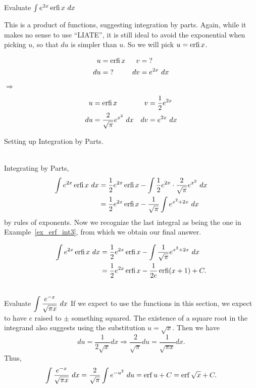 {Evaluate $\int e^{2x} \erfi x \ dx$}
{This is a product of functions, suggesting integration by parts.  Again, while it makes no sense to use ``LIATE'', it is still ideal to avoid the exponential when picking $u$, so that $du$ is simpler than $u$.  So we will pick $u=\operatorname{erfi} x$.

\noindent\begin{minipage}{\textwidth}
\noindent\begin{minipage}[t]{.45\textwidth}
\vskip-10pt
\begin{align*}
u&= \operatorname{erfi} x & v&=\text{?}\\
du&= \text{?} & dv&=e^{2x}\ dx
\end{align*}
\end{minipage}\begin{minipage}[t]{.1\textwidth}\centering\vskip15pt$\Rightarrow$\end{minipage}
\begin{minipage}[t]{.45\textwidth}
\vskip-10pt
\begin{align*}
u&= \operatorname{erfi} x & v&= \frac{1}{2} e^{2x}\\
du&=\frac{2}{\sqrt{\pi}} e^{x^2}\ dx  & dv&=e^{2x}\ dx
\end{align*}
\end{minipage}
\captionsetup{type=figure}%
\caption{Setting up Integration by Parts.}\label{fig:erf_int4}
\end{minipage}\\

Integrating by Parts,
\begin{align*}  \int e^{2x} \operatorname{erfi} x \ dx &= \frac{1}{2} e^{2x} \operatorname{erfi} x - \int\frac{1}{2} e^{2x} \cdot \frac{2}{\sqrt{\pi}} e^{x^2}  \ dx
\\&=  \frac{1}{2} e^{2x} \operatorname{erfi} x - \frac{1}{\sqrt{\pi}} \int  e^{x^2+2x}\ dx\end{align*}
by rules of exponents.  Now we recognize the last integral as being the one in Example~\ref{ex_erf_int3}, from which we obtain our final answer.

\begin{align*}
\int e^{2x} \operatorname{erfi} x \ dx &= \frac{1}{2} e^{2x} \operatorname{erfi} x - \int \frac{1}{\sqrt{\pi}} e^{x^2+2x}\ dx\\
&= \frac{1}{2} e^{2x} \operatorname{erfi} x - \frac{1}{2e} \operatorname{erfi}(x+1) +C.
\end{align*}
}\\

{Evaluate $\displaystyle \int \frac{e^{-x}}{\sqrt{\pi x}}\ dx$}
{If we expect to use the functions in this section, we expect to have $e$ raised to $\pm$ something squared.  The existence of a square root in the integrand also suggests using the substitution $u=\sqrt{x}$.  Then we have $$du = \frac{1}{2\sqrt{x}} dx \Rightarrow \frac{2}{\sqrt{\pi}}du = \frac{1}{\sqrt{\pi x}} dx.$$  Thus,
$$\int \frac{e^{-x}}{\sqrt{\pi x}}\ dx = \frac{2}{\sqrt{\pi}} \int e^{-u^2}\ du = \operatorname{erf} u+ C = \operatorname{erf}\sqrt{x} + C.$$
}\\\clearpage

